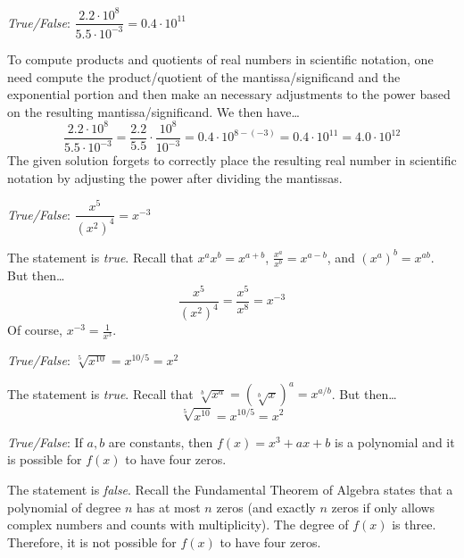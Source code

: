 \documentclass[11pt,letterpaper]{article}
\begin{document}
\quizsol \textit{True/False}: $\dfrac{2.2 \cdot 10^8}{5.5 \cdot 10^{-3}}= 0.4 \cdot 10^{11}$ \pspace

\sol To compute products and quotients of real numbers in scientific notation, one need compute the product/quotient of the mantissa/significand and the exponential portion and then make an necessary adjustments to the power based on the resulting mantissa/significand. We then have\dots
	\[
	\dfrac{2.2 \cdot 10^8}{5.5 \cdot 10^{-3}}= \dfrac{2.2}{5.5} \cdot \dfrac{10^8}{10^{-3}}= 0.4 \cdot 10^{8 - (-3)}= 0.4 \cdot 10^{11}= 4.0 \cdot 10^{12}
	\] 
The given solution forgets to correctly place the resulting real number in scientific notation by adjusting the power after dividing the mantissas. \pvspace{1.3cm}



\quizsol \textit{True/False}: $\dfrac{x^5}{(x^2)^4}= x^{-3}$ \pspace

\sol The statement is \textit{true}. Recall that $x^a x^b= x^{a+b}$, $\frac{x^a}{x^b}= x^{a-b}$, and $(x^a)^b= x^{ab}$. But then\dots
	\[
	\dfrac{x^5}{(x^2)^4}= \dfrac{x^5}{x^8}= x^{-3}
	\]
Of course, $x^{-3}= \frac{1}{x^3}$. \pvspace{1.3cm}



\quizsol \textit{True/False}: $\sqrt[5]{x^{10}}= x^{10/5}= x^2$ \pspace

\sol The statement is \textit{true}. Recall that $\sqrt[b]{x^a}= \left( \sqrt[b]{x} \right)^a= x^{a/b}$. But then\dots
	\[
	\sqrt[5]{x^{10}}= x^{10/5}= x^2
	\] \pvspace{1.3cm}



\quizsol \textit{True/False}: If $a, b$ are constants, then $f(x)= x^3 + ax + b$ is a polynomial and it is possible for $f(x)$ to have four zeros. \pspace

\sol The statement is \textit{false}. Recall the Fundamental Theorem of Algebra states that a polynomial of degree $n$ has at most $n$ zeros (and exactly $n$ zeros if only allows complex numbers and counts with multiplicity). The degree of $f(x)$ is three. Therefore, it is not possible for $f(x)$ to have four zeros. 
\end{document}
